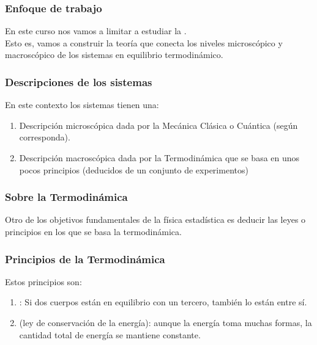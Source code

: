 \documentclass[12pt]{beamer}
\begin{document}
\begin{frame}
\frametitle{Enfoque de trabajo}
En este curso nos vamos a limitar a estudiar la .
\\
\bigskip
\pause
Esto es, vamos a construir la teoría que conecta los niveles microscópico y macroscópico de los sistemas en equilibrio termodinámico.
\end{frame}
\begin{frame}
\frametitle{Descripciones de los sistemas}
En este contexto los sistemas tienen una:
\pause
\begin{enumerate}[<+->]
\item Descripción microscópica dada por la Mecánica Clásica o Cuántica (según corresponda).
\item Descripción macroscópica dada por la Termodinámica que se basa en unos pocos principios (deducidos de
un conjunto de experimentos)
\end{enumerate}
\end{frame}
\begin{frame}
\frametitle{Sobre la Termodinámica}
Otro de los objetivos fundamentales de la física estadística es deducir las leyes o principios en los que se basa la termodinámica.
\end{frame}
\begin{frame}
\frametitle{Principios de la Termodinámica}
Estos principios son:
\pause
{}
\begin{enumerate}[<+->]
\item {}: Si dos cuerpos están en equilibrio con un tercero, también lo están entre sí.
\item {} (ley de conservación de la energía): aunque la energía toma muchas formas, la cantidad
total de energía se mantiene constante.
\seti
\end{enumerate}
\end{frame}
\end{document}
